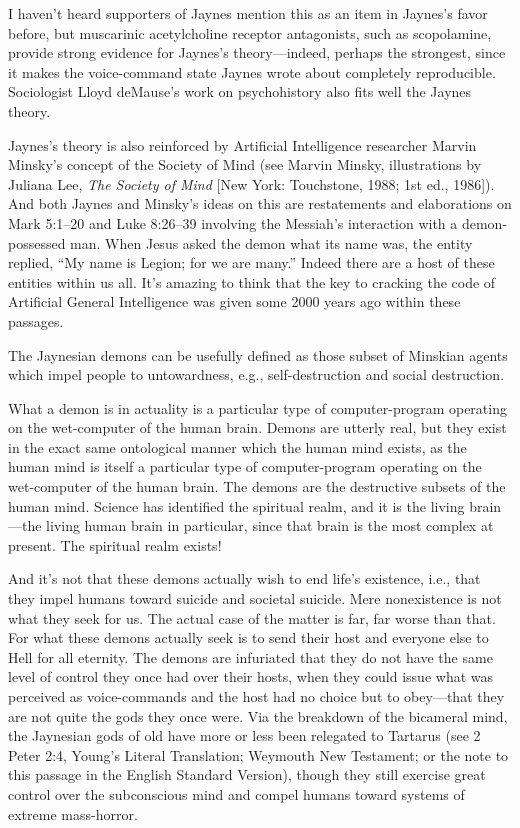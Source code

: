 \documentclass[letterpaper,12pt]{article}
\begin{document}
I haven't heard supporters of Jaynes mention this as an item in Jaynes's favor before, but muscarinic acetylcholine receptor antagonists, such as scopolamine, provide strong evidence for Jaynes's theory---indeed, perhaps the strongest, since it makes the voice-command state Jaynes wrote about completely reproducible. Sociologist Lloyd deMause's work on psychohistory also fits well the Jaynes theory.

Jaynes's theory is also reinforced by Artificial Intelligence researcher Marvin Minsky's concept of the Society of Mind (see Marvin Minsky, illustrations by Juliana Lee, \emph{The Society of Mind} [New York: Touchstone, 1988; 1st ed., 1986]). And both Jaynes and Minsky's ideas on this are restatements and elaborations on Mark 5:1--20 and Luke 8:26--39 involving the Messiah's interaction with a demon-possessed man. When Jesus asked the demon what its name was, the entity replied, ``My name is Legion; for we are many.'' Indeed there are a host of these entities within us all. It's amazing to think that the key to cracking the code of Artificial General Intelligence was given some 2000 years ago within these passages.

The Jaynesian demons can be usefully defined as those subset of Minskian agents which impel people to untowardness, e.g., self-destruction and social destruction.

What a demon is in actuality is a particular type of computer-program operating on the wet-computer of the human brain. Demons are utterly real, but they exist in the exact same ontological manner which the human mind exists, as the human mind is itself a particular type of computer-program operating on the wet-computer of the human brain. The demons are the destructive subsets of the human mind. Science has identified the spiritual realm, and it is the living brain---the living human brain in particular, since that brain is the most complex at present. The spiritual realm exists!

And it's not that these demons actually wish to end life's existence, i.e., that they impel humans toward suicide and societal suicide. Mere nonexistence is not what they seek for us. The actual case of the matter is far, far worse than that. For what these demons actually seek is to send their host and everyone else to Hell for all eternity. The demons are infuriated that they do not have the same level of control they once had over their hosts, when they could issue what was perceived as voice-commands and the host had no choice but to obey---that they are not quite the gods they once were. Via the breakdown of the bicameral mind, the Jaynesian gods of old have more or less been relegated to Tartarus (see 2 Peter 2:4, Young's Literal Translation; Weymouth New Testament; or the note to this passage in the English Standard Version), though they still exercise great control over the subconscious mind and compel humans toward systems of extreme mass-horror.
\end{document}
